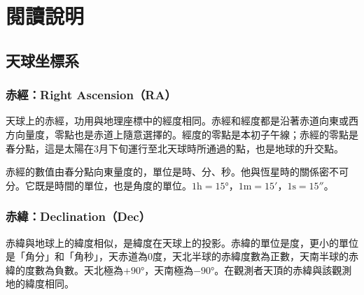 \section{閱讀說明}

\subsection{天球坐標系}
\subsubsection{赤經：Right Ascension（RA）}
天球上的赤經，功用與地理座標中的經度相同。赤經和經度都是沿著赤道向東或西方向量度，零點也是赤道上隨意選擇的。經度的零點是本初子午線；赤經的零點是春分點，這是太陽在3月下旬運行至北天球時所通過的點，也是地球的升交點。
\par
赤經的數值由春分點向東量度的，單位是時、分、秒。他與恆星時的關係密不可分。它既是時間的單位，也是角度的單位。\(1\text{h}=\ang{15;;}\text{，}1\text{m}=\ang{;15;}\text{，}1\text{s}=\ang{;;15}\)。
\subsubsection{赤緯：Declination（Dec）}
赤緯與地球上的緯度相似，是緯度在天球上的投影。赤緯的單位是度，更小的單位是「角分」和「角秒」，天赤道為0度，天北半球的赤緯度數為正數，天南半球的赤緯的度數為負數。天北極為\(+\ang{90;;}\)，天南極為\(-\ang{90;;}\)。在觀測者天頂的赤緯與該觀測地的緯度相同。
